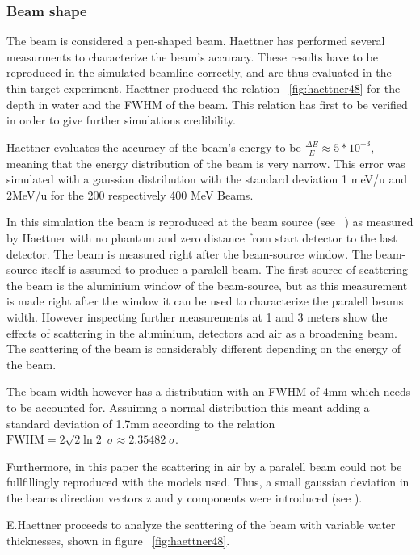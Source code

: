 \subsubsection{Beam shape}


The beam is considered a pen-shaped beam. Haettner has performed several measurments to characterize the beam's accuracy. These results have to be reproduced in the simulated beamline correctly, and are thus evaluated in the thin-target experiment. Haettner produced the relation ~\ref{fig:haettner48} for the depth in water and the FWHM of the beam. This relation has first to be verified in order to give further simulations credibility.

Haettner evaluates the accuracy of the beam's energy to be $\frac{\Delta E}{E}\approx5*10^{-3}$, meaning that the energy distribution of the beam is very narrow. This error was simulated with a gaussian distribution with the standard deviation 1 meV/u and 2MeV/u for the 200 respectively 400 MeV Beams.

In this simulation the beam is reproduced at the beam source (see ~\cite[1]{fig:SimSetup}) as measured by Haettner with no phantom and zero distance from start detector to the last detector. The beam is measured right after the beam-source window. The beam-source itself is assumed to produce a paralell beam. The first source of scattering the beam is the aluminium window of the beam-source, but as this measurement is made right after the window it can be used to characterize the paralell beams width. However inspecting further measurements at 1 and 3 meters show the effects of scattering in the aluminium, detectors and air as a broadening beam. The scattering of the beam is considerably different depending on the energy of the beam.

The beam width however has a distribution with an FWHM of 4mm which needs to be accounted for. Assuimng a normal distribution this meant adding a standard deviation of 1.7mm according to the relation $\mathrm{FWHM} =   2 \sqrt{2 \ln 2 } \; \sigma \approx 2.35482 \; \sigma$.

Furthermore, in this paper the scattering in air by a paralell beam could not be fullfillingly reproduced with the models used. Thus, a small gaussian deviation in the beams direction vectors z and y components were introduced (see \cite{beamShapeAnalysis}).

E.Haettner proceeds to analyze the scattering of the beam with variable water thicknesses, shown in figure ~\ref{fig:haettner48}.

